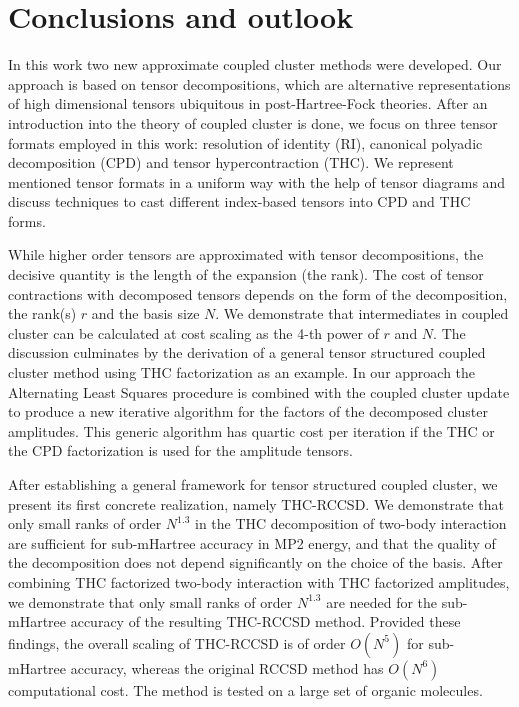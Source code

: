 \chapter{Conclusions and outlook
\label{ch:conclusions}}
In this work two new approximate coupled cluster methods were developed. Our 
approach is based on tensor decompositions, which are alternative 
representations of high dimensional tensors ubiquitous in post-Hartree-Fock 
theories. After an introduction into the theory of coupled cluster is done, we 
focus on three tensor formats employed in this work: resolution of 
identity (RI), canonical polyadic decomposition (CPD) and tensor 
hypercontraction (THC). We represent mentioned tensor formats in a uniform way 
with the help of tensor diagrams and discuss techniques to cast different 
index-based tensors into CPD and THC forms. 

While higher order tensors are approximated with tensor decompositions, the 
decisive quantity is the length of the expansion (the rank). The cost of 
tensor contractions with decomposed tensors depends on the form of the 
decomposition, the rank(s) $r$ and the basis size $N$. We 
demonstrate that intermediates in coupled cluster can be calculated at 
cost scaling as the 4-th power of $r$ and $N$. The discussion culminates by 
the derivation of a general tensor structured coupled cluster method using THC 
factorization as an example. In our approach the Alternating Least Squares 
procedure is combined with the coupled cluster update to produce a new 
iterative algorithm for the factors of the decomposed cluster amplitudes. This 
generic algorithm has quartic cost per iteration if the THC or the CPD 
factorization is used for the amplitude tensors.

After establishing a general framework for tensor structured coupled cluster, 
we present its first concrete realization, namely THC-RCCSD. We demonstrate 
that only small ranks of order $N^{1.3}$ in the THC decomposition of two-body 
interaction are sufficient for sub-mHartree accuracy in MP2 energy, and 
that the quality of the decomposition does not depend significantly on the 
choice of the basis. After combining THC factorized two-body interaction with 
THC factorized amplitudes, we demonstrate that only small ranks of order 
$N^{1.3}$ are needed for the sub-mHartree accuracy of the resulting THC-RCCSD 
method. Provided these findings, the overall scaling of THC-RCCSD is of order 
$O(N^{5})$ for sub-mHartree accuracy, whereas the original RCCSD method has 
$O(N^{6})$ computational cost. The method is tested on a large set of organic 
molecules.   

